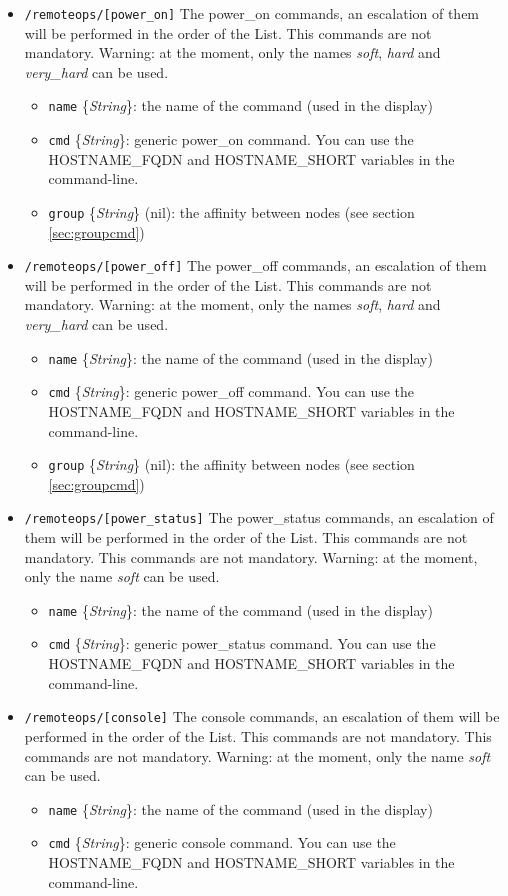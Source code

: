 \documentclass[a4wide,10pt,oneside]{book}
\newcommand{\ypath}[1]{\texttt{#1}}
\newcommand{\yfield}[2]{\texttt{#1} {\small\{{\emph{#2}}\}}:}
\newcommand{\yfieldd}[3]{\texttt{#1} {\small\{{\emph{#2}}\}} {\small(}#3{\small)}:}
\begin{document}
\begin{itemize}
  \item \ypath{/remoteops/[power\_on]} The power\_on commands, an escalation of them will be performed in the order of the List. This commands are not mandatory. Warning: at the moment, only the names \emph{soft}, \emph{hard} and \emph{very\_hard} can be used.
  \begin{itemize}
    \item \yfield{name}{String} the name of the command (used in the display)
    \item \yfield{cmd}{String} generic power\_on command. You can use the HOSTNAME\_FQDN and HOSTNAME\_SHORT variables in the command-line.
    \item \yfieldd{group}{String}{nil} the affinity between nodes (see section \ref{sec:groupcmd})
  \end{itemize}

  \item \ypath{/remoteops/[power\_off]} The power\_off commands, an escalation of them will be performed in the order of the List. This commands are not mandatory. Warning: at the moment, only the names \emph{soft}, \emph{hard} and \emph{very\_hard} can be used.
  \begin{itemize}
    \item \yfield{name}{String} the name of the command (used in the display)
    \item \yfield{cmd}{String} generic power\_off command. You can use the HOSTNAME\_FQDN and HOSTNAME\_SHORT variables in the command-line.
    \item \yfieldd{group}{String}{nil} the affinity between nodes (see section \ref{sec:groupcmd})
  \end{itemize}

  \item \ypath{/remoteops/[power\_status]} The power\_status commands, an escalation of them will be performed in the order of the List. This commands are not mandatory. This commands are not mandatory. Warning: at the moment, only the name \emph{soft} can be used.
  \begin{itemize}
    \item \yfield{name}{String} the name of the command (used in the display)
    \item \yfield{cmd}{String} generic power\_status command. You can use the HOSTNAME\_FQDN and HOSTNAME\_SHORT variables in the command-line.
  \end{itemize}

  \item \ypath{/remoteops/[console]} The console commands, an escalation of them will be performed in the order of the List. This commands are not mandatory. This commands are not mandatory. Warning: at the moment, only the name \emph{soft} can be used.
  \begin{itemize}
    \item \yfield{name}{String} the name of the command (used in the display)
    \item \yfield{cmd}{String} generic console command. You can use the HOSTNAME\_FQDN and HOSTNAME\_SHORT variables in the command-line.
  \end{itemize}


\end{itemize}
\end{document}
